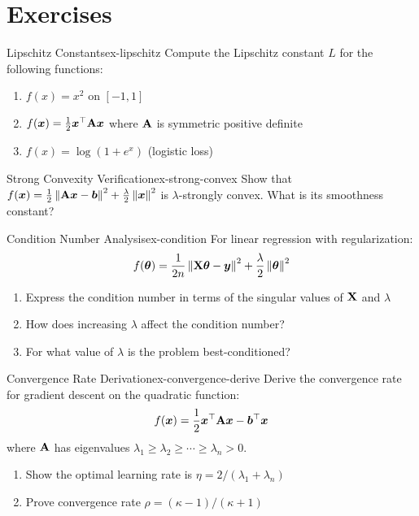 \documentclass[../../main.tex]{subfiles}
\begin{document}
\fi %

\section{Exercises}
\label{sec:conv-exercises}

\begin{exercise}{Lipschitz Constants}{ex-lipschitz}
Compute the Lipschitz constant $L$ for the following functions:
\begin{enumerate}[label=(\alph*)]
    \item $f(x) = x^2$ on $[-1, 1]$
    \item $f(\boldsymbol{x}) = \frac{1}{2}\boldsymbol{x}^\top \mathbf{A} \boldsymbol{x}$ where $\mathbf{A}$ is symmetric positive definite
    \item $f(x) = \log(1 + e^x)$ (logistic loss)
\end{enumerate}
\end{exercise}

\begin{exercise}{Strong Convexity Verification}{ex-strong-convex}
Show that $f(\boldsymbol{x}) = \frac{1}{2}\left\lVert \mathbf{A}\boldsymbol{x} - \boldsymbol{b} \right\rVert^2 + \frac{\lambda}{2}\left\lVert \boldsymbol{x} \right\rVert^2$ is $\lambda$-strongly convex. What is its smoothness constant?
\end{exercise}

\begin{exercise}{Condition Number Analysis}{ex-condition}
For linear regression with regularization:
\[
    f(\boldsymbol{\theta}) = \frac{1}{2n}\left\lVert \mathbf{X}\boldsymbol{\theta} - \boldsymbol{y} \right\rVert^2 + \frac{\lambda}{2}\left\lVert \boldsymbol{\theta} \right\rVert^2
\]
\begin{enumerate}[label=(\alph*)]
    \item Express the condition number in terms of the singular values of $\mathbf{X}$ and $\lambda$
    \item How does increasing $\lambda$ affect the condition number?
    \item For what value of $\lambda$ is the problem best-conditioned?
\end{enumerate}
\end{exercise}

\begin{exercise}{Convergence Rate Derivation}{ex-convergence-derive}
Derive the convergence rate for gradient descent on the quadratic function:
\[
    f(\boldsymbol{x}) = \frac{1}{2}\boldsymbol{x}^\top \mathbf{A} \boldsymbol{x} - \boldsymbol{b}^\top \boldsymbol{x}
\]
where $\mathbf{A}$ has eigenvalues $\lambda_1 \geq \lambda_2 \geq \cdots \geq \lambda_n > 0$.
\begin{enumerate}[label=(\alph*)]
    \item Show the optimal learning rate is $\eta = 2/(\lambda_1 + \lambda_n)$
    \item Prove convergence rate $\rho = (\kappa - 1)/(\kappa + 1)$
\end{enumerate}
\end{exercise}
\end{document}
